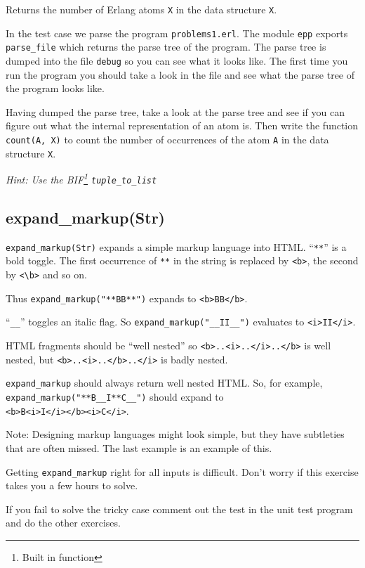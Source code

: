 \documentclass[12pt]{hitec}
\begin{document}
Returns the number of Erlang atoms \verb+X+ in the data structure \verb+X+.

In the test case we parse the program \verb+problems1.erl+.  The
module \verb+epp+ exports \verb+parse_file+ which returns the parse
tree of the program. The parse tree is dumped into the file
\verb+debug+ so you can see what it looks like. The first time you run
the program you should take a look in the file and see what the parse
tree of the program looks like.

Having dumped the parse tree, take a look at the parse tree and see if
you can figure out what the internal representation of an atom
is. Then write the function \verb+count(A, X)+ to count the number of
occurrences of the atom \verb+A+ in the data structure \verb+X+.

{\sl Hint: Use the BIF\footnote{Built in function} \verb+tuple_to_list+}

\subsection{expand\_markup(Str)}

\verb+expand_markup(Str)+ expands a simple markup language into HTML.
``\verb+**+'' is a bold toggle. The first occurrence of \verb+**+ in the string
is replaced by \verb+<b>+, the second by \verb+<\b>+ and so on.

Thus \verb+expand_markup("**BB**")+ expands to \verb+<b>BB</b>+.

``\verb+__+'' toggles an italic flag. So \verb+expand_markup("__II__")+ evaluates to
\verb+<i>II</i>+.

HTML fragments should be ``well nested'' so
\verb+<b>..<i>..</i>..</b>+ is well nested, but \verb+<b>..<i>..</b>..</i>+ is
badly nested.

\verb+expand_markup+ should always return well nested HTML. 
So, for example, \verb+expand_markup("**B__I**C__")+ should expand
to\\
\verb+<b>B<i>I</i></b><i>C</i>+.

Note: Designing markup languages might look simple, but they have
subtleties that are often missed. The last example is an example of
this.

Getting \verb+expand_markup+ right for all inputs is difficult.  Don't
worry if this exercise takes you a few hours to solve.

If you fail to solve the tricky case comment out the test in the unit
test program and do the other exercises.
\end{document}
